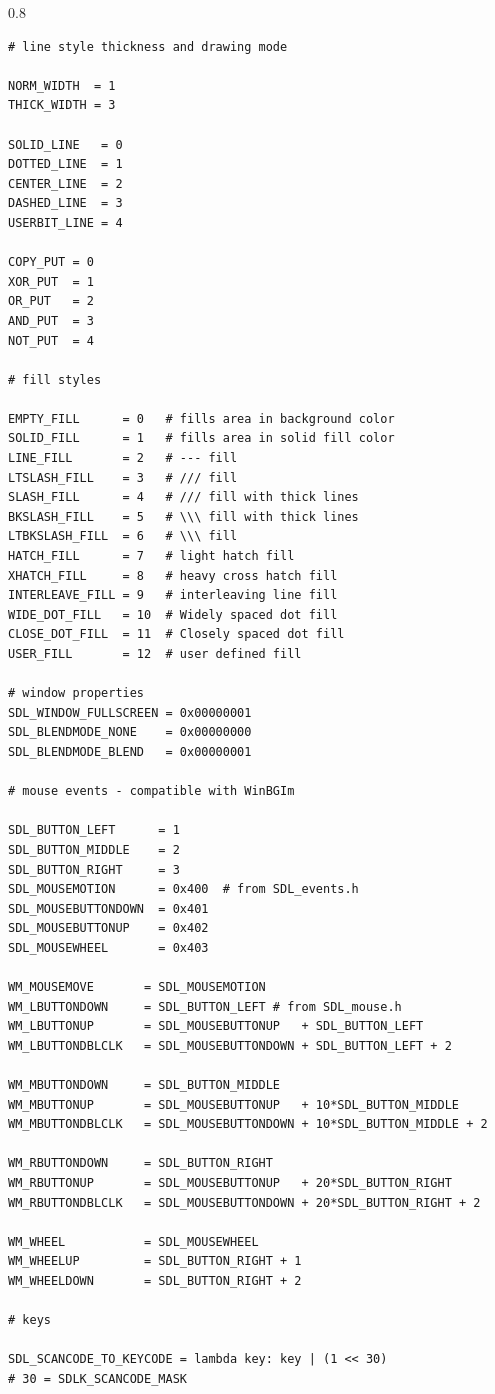 \documentclass[a4paper,12pt]{article}
\newenvironment{margins}[2]
{ %
\begin{list}{}
{
\setlength{\leftmargin}{#1}
\setlength{\rightmargin}{#2}
} \item
} %
{\end{list}}
\begin{document}
\begin{margins}{-0.5cm}{-0.5cm}
\begin{spacing}{0.8}
\begin{lstlisting}
# line style thickness and drawing mode

NORM_WIDTH  = 1
THICK_WIDTH = 3

SOLID_LINE   = 0
DOTTED_LINE  = 1
CENTER_LINE  = 2
DASHED_LINE  = 3
USERBIT_LINE = 4

COPY_PUT = 0
XOR_PUT  = 1
OR_PUT   = 2
AND_PUT  = 3
NOT_PUT  = 4

# fill styles

EMPTY_FILL      = 0   # fills area in background color
SOLID_FILL      = 1   # fills area in solid fill color
LINE_FILL       = 2   # --- fill
LTSLASH_FILL    = 3   # /// fill
SLASH_FILL      = 4   # /// fill with thick lines
BKSLASH_FILL    = 5   # \\\ fill with thick lines
LTBKSLASH_FILL  = 6   # \\\ fill
HATCH_FILL      = 7   # light hatch fill
XHATCH_FILL     = 8   # heavy cross hatch fill
INTERLEAVE_FILL = 9   # interleaving line fill
WIDE_DOT_FILL   = 10  # Widely spaced dot fill
CLOSE_DOT_FILL  = 11  # Closely spaced dot fill
USER_FILL       = 12  # user defined fill

# window properties
SDL_WINDOW_FULLSCREEN = 0x00000001
SDL_BLENDMODE_NONE    = 0x00000000
SDL_BLENDMODE_BLEND   = 0x00000001

# mouse events - compatible with WinBGIm

SDL_BUTTON_LEFT      = 1
SDL_BUTTON_MIDDLE    = 2
SDL_BUTTON_RIGHT     = 3
SDL_MOUSEMOTION      = 0x400  # from SDL_events.h
SDL_MOUSEBUTTONDOWN  = 0x401
SDL_MOUSEBUTTONUP    = 0x402
SDL_MOUSEWHEEL       = 0x403

WM_MOUSEMOVE       = SDL_MOUSEMOTION
WM_LBUTTONDOWN     = SDL_BUTTON_LEFT # from SDL_mouse.h
WM_LBUTTONUP       = SDL_MOUSEBUTTONUP   + SDL_BUTTON_LEFT
WM_LBUTTONDBLCLK   = SDL_MOUSEBUTTONDOWN + SDL_BUTTON_LEFT + 2

WM_MBUTTONDOWN     = SDL_BUTTON_MIDDLE
WM_MBUTTONUP       = SDL_MOUSEBUTTONUP   + 10*SDL_BUTTON_MIDDLE
WM_MBUTTONDBLCLK   = SDL_MOUSEBUTTONDOWN + 10*SDL_BUTTON_MIDDLE + 2

WM_RBUTTONDOWN     = SDL_BUTTON_RIGHT
WM_RBUTTONUP       = SDL_MOUSEBUTTONUP   + 20*SDL_BUTTON_RIGHT
WM_RBUTTONDBLCLK   = SDL_MOUSEBUTTONDOWN + 20*SDL_BUTTON_RIGHT + 2

WM_WHEEL           = SDL_MOUSEWHEEL
WM_WHEELUP         = SDL_BUTTON_RIGHT + 1
WM_WHEELDOWN       = SDL_BUTTON_RIGHT + 2

# keys

SDL_SCANCODE_TO_KEYCODE = lambda key: key | (1 << 30)
# 30 = SDLK_SCANCODE_MASK


\end{lstlisting}
\end{spacing}
\end{margins}
\end{document}
